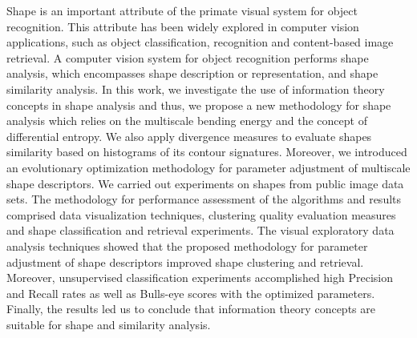 
 Shape is an important attribute of the primate visual system for object recognition. This attribute has been widely explored in computer vision applications, such as object classification, recognition and content-based image retrieval. A computer vision system for object recognition performs shape analysis, which encompasses shape description or representation, and shape similarity analysis. In this work, we investigate the use of information theory concepts in shape analysis and thus, we propose a new methodology for shape analysis which relies on the multiscale bending energy and the concept of differential entropy. We also apply divergence measures to evaluate shapes similarity based on histograms of its contour signatures.
Moreover, we introduced an evolutionary optimization methodology for parameter adjustment of multiscale shape descriptors. 
We carried out experiments on shapes from public image data sets. The methodology for performance assessment of the algorithms and results comprised data visualization techniques, clustering quality evaluation measures and shape classification and retrieval experiments. 
The visual exploratory data analysis techniques showed that the proposed methodology for parameter adjustment of shape descriptors  improved shape clustering and retrieval. Moreover, unsupervised classification experiments accomplished high Precision and Recall rates as well as Bulls-eye scores with the optimized parameters.  Finally, the results led us to conclude that information theory concepts are suitable for shape and similarity analysis. 

